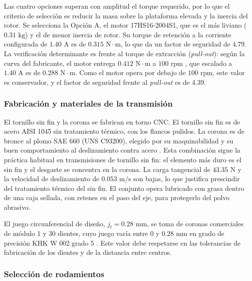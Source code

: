 \documentclass[../../General.tex]{subfiles}
\begin{document}
Las cuatro opciones superan con amplitud el torque requerido, por lo que el criterio de selección es reducir la masa sobre la plataforma elevada y la inercia del rotor. Se selecciona la Opción A, el motor 17HS16-2004S1, que es el más liviano ($0.31\text{ kg}$) y el de menor inercia de rotor. Su torque de retención a la corriente configurada de $1.40\text{ A}$ es de $0.315\text{ N}\cdot\text{m}$, lo que da un factor de seguridad de $4.79$. La verificación determinante es frente al torque de extracción (\textit{pull-out}): según la curva del fabricante, el motor entrega $0.412\text{ N}\cdot\text{m}$ a $100\text{ rpm}$ \citep{stepperonline_17hs16}, que escalado a $1.40\text{ A}$ es de $0.288\text{ N}\cdot\text{m}$. Como el motor opera por debajo de $100\text{ rpm}$, este valor es conservador, y el factor de seguridad frente al \textit{pull-out} es de $4.39$.

\subsubsection{Fabricación y materiales de la transmisión}

El tornillo sin fin y la corona se fabrican en torno CNC. El tornillo sin fin es de acero AISI 1045 sin tratamiento térmico, con los flancos pulidos. La corona es de bronce al plomo SAE 660 (UNS C93200), elegido por su maquinabilidad y su buen comportamiento al deslizamiento contra acero \citep{asm1990nonferrous}. Esta combinación sigue la práctica habitual en transmisiones de tornillo sin fin: el elemento más duro es el sin fin y el desgaste se concentra en la corona. La carga tangencial de $43.35\text{ N}$ y la velocidad de deslizamiento de $0.053\text{ m/s}$ son bajas, lo que justifica prescindir del tratamiento térmico del sin fin. El conjunto opera lubricado con grasa dentro de una caja sellada, con retenes en el paso del eje, para protegerlo del polvo abrasivo.

El juego circunferencial de diseño, $j_t = 0.28\text{ mm}$, se toma de coronas comerciales de módulo 1 y 30 dientes, cuyo juego varía entre $0$ y $0.28\text{ mm}$ en grado de precisión KHK W 002 grado 5 \citep{khk_pg1_30r1j8}. Este valor debe respetarse en las tolerancias de fabricación de los dientes y de la distancia entre centros.

\subsubsection{Selección de rodamientos}
\end{document}
